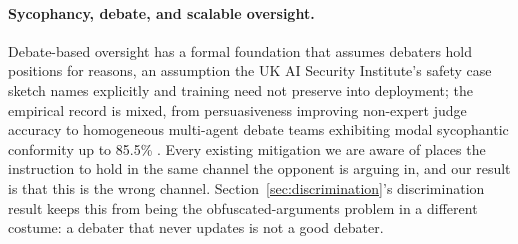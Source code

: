 \paragraph{Sycophancy, debate, and scalable oversight.} Debate-based oversight has a
formal foundation \citep{irving2018debate,browncohen2023doublyefficient} that assumes
debaters hold positions for reasons, an assumption the UK AI Security Institute's
safety case sketch \citep{buhl2025aisi} names explicitly and training need not
preserve into deployment; the empirical record is mixed, from persuasiveness improving
non-expert judge accuracy \citep{khan2024persuasive} to homogeneous multi-agent debate
teams exhibiting modal sycophantic conformity up to 85.5\% \citep{bertalanic2026costofconsensus}.
Every existing mitigation we are aware of places the instruction to hold in the same
channel the opponent is arguing in, and our result is that this is the wrong channel.
Section~\ref{sec:discrimination}'s discrimination result keeps this from being the
obfuscated-arguments problem \citep{barnes2020obfuscated} in a different costume: a
debater that never updates is not a good debater.

